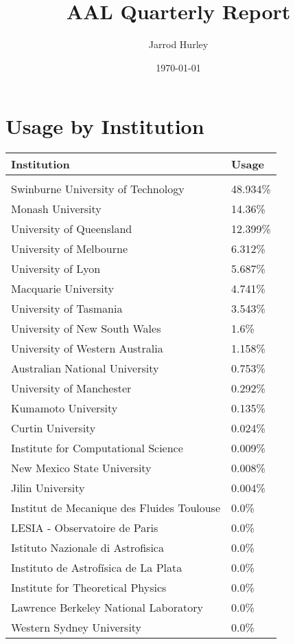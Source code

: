 \documentclass{article}%
\title{AAL Quarterly Report}%
\author{Jarrod Hurley}%
\date{\today}%
\begin{document}
%
\normalsize%
\maketitle%
\newpage%
\section{Usage by Institution }%

%
\begin{longtabu}{X[l] X[r]}%
\textbf{Institution}&\textbf{Usage}\\%
\hline%
&\\%
Swinburne University of Technology&48.934\%\\%
\hline%
Monash University&14.36\%\\%
\hline%
University of Queensland&12.399\%\\%
\hline%
University of Melbourne&6.312\%\\%
\hline%
University of Lyon&5.687\%\\%
\hline%
Macquarie University&4.741\%\\%
\hline%
University of Tasmania&3.543\%\\%
\hline%
University of New South Wales&1.6\%\\%
\hline%
University of Western Australia&1.158\%\\%
\hline%
Australian National University&0.753\%\\%
\hline%
University of Manchester&0.292\%\\%
\hline%
Kumamoto University&0.135\%\\%
\hline%
Curtin University&0.024\%\\%
\hline%
Institute for Computational Science&0.009\%\\%
\hline%
New Mexico State University&0.008\%\\%
\hline%
Jilin University&0.004\%\\%
\hline%
Institut de Mecanique des Fluides Toulouse&0.0\%\\%
\hline%
LESIA {-} Observatoire de Paris&0.0\%\\%
\hline%
Istituto Nazionale di Astrofisica&0.0\%\\%
\hline%
Instituto de Astrofísica de La Plata&0.0\%\\%
\hline%
Institute for Theoretical Physics&0.0\%\\%
\hline%
Lawrence Berkeley National Laboratory&0.0\%\\%
\hline%
Western Sydney University&0.0\%\\%

\end{longtabu}
\end{document}
